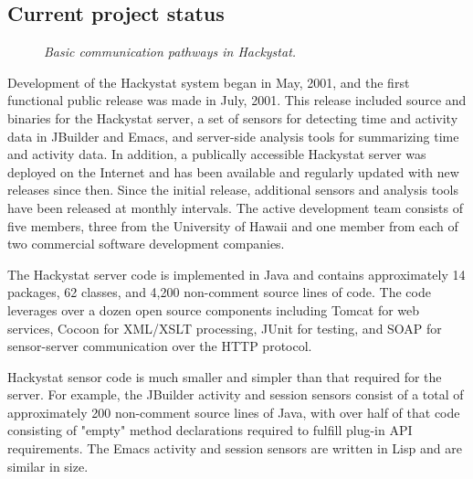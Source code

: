 
\subsection{Current project status}

\begin{figure}[t]
 {\centerline {}}
 \caption{{\em Basic communication pathways in Hackystat.}}
 \label{fig:dataflow}
\end{figure}


Development of the Hackystat system began in May, 2001, and the first
functional public release was made in July, 2001. This release included
source and binaries for the Hackystat server, a set of sensors for
detecting time and activity data in JBuilder and Emacs, and server-side
analysis tools for summarizing time and activity data.  In addition, a
publically accessible Hackystat server was deployed on the Internet and has
been available and regularly updated with new releases since then.  Since
the initial release, additional sensors and analysis tools have been
released at monthly intervals.  The active development team consists of
five members, three from the University of Hawaii and one member from each
of two commercial software development companies.

The Hackystat server code is implemented in Java and contains approximately
14 packages, 62 classes, and 4,200 non-comment source lines of code.  The
code leverages over a dozen open source components including Tomcat for web
services, Cocoon for XML/XSLT processing, JUnit for testing, and SOAP for
sensor-server communication over the HTTP protocol.

Hackystat sensor code is much smaller and simpler than that required for
the server.  For example, the JBuilder activity and session sensors consist
of a total of approximately 200 non-comment source lines of Java, with over
half of that code consisting of "empty" method declarations required to
fulfill plug-in API requirements.  The Emacs activity and session sensors
are written in Lisp and are similar in size.

